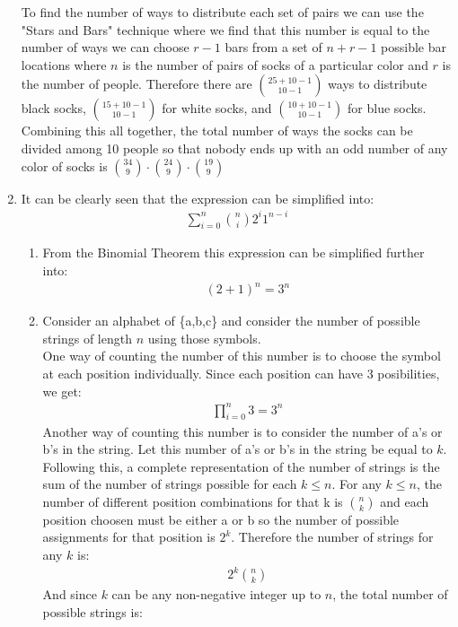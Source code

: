 \documentclass[11pt]{article}
\begin{document}
\begin{enumerate}[]
	 To find the number of ways to distribute each set of pairs we can use the "Stars and Bars" technique where we find that this number is equal to the number of ways we can choose $r-1$ bars from a set of $n+r-1$ possible bar locations where $n$ is the number of pairs of socks of a particular color and $r$ is the number of people. Therefore there are $\binom{25+10-1}{10-1}$ ways to distribute black socks, $\binom{15+10-1}{10-1}$ for white socks, and $\binom{10+10-1}{10-1}$ for blue socks.\\
	 Combining this all together, the total number of ways the socks can be divided among 10 people so that nobody ends up with an odd number of any color of socks is $\binom{34}{9}\cdot\binom{24}{9}\cdot\binom{19}{9}$
\item
	It can be clearly seen that the expression can be simplified into:
	\begin{gather}
		\sum_{i=0}^n \binom{n}{i}2^{i}1^{n-i} \nonumber
	\end{gather}
\begin{enumerate}[label=\alph*]
\item
	From the Binomial Theorem this expression can be simplified further into:
	\begin{gather}
		(2+1)^n = 3^n \nonumber
	\end{gather}
\item
	Consider an alphabet of \{a,b,c\} and consider the number of possible strings of length $n$ using those symbols.\\
	One way of counting the number of this number is to choose the symbol at each position individually. Since each position can have 3 posibilities, we get:
	\begin{gather}
		\prod_{i=0}^{n}3 = 3^n \nonumber
	\end{gather}
	Another way of counting this number is to consider the number of a's or b's in the string. Let this number of a's or b's in the string be equal to $k$. Following this, a complete representation of the number of strings is the sum of the number of strings possible for each $k \leq n$. For any $k \leq n$, the number of different position combinations for that k is $\binom{n}{k}$ and each position choosen must be either a or b so the number of possible assignments for that position is $2^k$. Therefore the number of strings for any $k$ is: 
	\begin{gather}
		2^{k}\binom{n}{k} \nonumber
	\end{gather}
And since $k$ can be any non-negative integer up to $n$, the total number of possible strings is:

\end{enumerate}
\end{enumerate}
\end{document}
